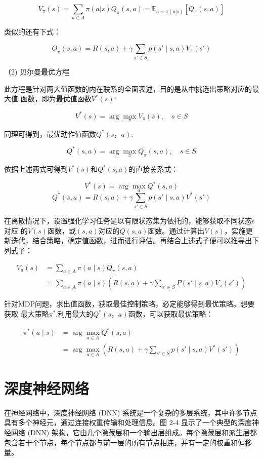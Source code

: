 \[
V_{\pi}(s) = \sum_{a \in A} \pi(a|s) Q_{\pi}(s,a) = \mathbb{E}_{a \sim \pi(a|s)} \left[ Q_{\pi}(s,a) \right]
\]

类似的还有下式：

\[
\underline{O}_{\pi}(s, a) = R(s, a) + \gamma \sum_{s' \in S} p(s' \mid s, a) V_{\pi}(s')
\]

（2) 贝尔曼最优方程

此方程是针对两大值函数的内在联系的全面表述，目的是从中挑选出策略对应的最大值
函数，即为最优值函数$V^*(s)$:

\[
V^*(s) = \arg\max_{\pi} V_{\pi}(s), \quad s \in S
\]

同理可得到，最优动作值函数$Q^*(s，a)$:

\[
Q^*(s, a) = \arg\max_{\pi} Q_{\pi}(s, a), \quad s \in S
\]

依据上述两式可得到$V^*(s)$和$Q^*(s,a)$的直接关系式：

\[
V^*(s) = \arg\max_{a} Q^*(s, a)
\]
\[
Q^*(s, a) = R(s, a) + \gamma \sum_{s' \in S} p(s' \mid s, a) V^*(s')
\]

在离散情况下，设置强化学习任务是以有限状态集为依托的，能够获取不同状态s对应
的$V(s)$函数，或$(s,a)$对应的$Q(s,a)$函数。通过计算出$V(s)$，实施更新迭代，结合策略，确定值函数，进而进行评估。再结合上述式子便可以推导出下列式子：

\begin{align*}
	V_{\pi}(s) &= \sum_{a \in A} \pi(a \mid s) Q_{\pi}(s, a) \\
	&= \sum_{a \in A} \pi(a \mid s) \left( R(s, a) + \gamma \sum_{s' \in S} P(s' \mid s, a) V_{\pi}(s') \right)
\end{align*}

针对MDP问题，求出值函数，获取最佳控制策略，必定能够得到最优策略。想要获取
最大策略$\pi^*$,利用最大的$Q^*(s，a)$函数，可以获取最优策略：

\begin{align*}
	\pi^*(a \mid s) &= \arg\max_{a \in A} Q^*(s, a) \\
	&= \arg\max_{a \in A} \left( R(s, a) + \gamma \sum_{s' \in S} p(s' \mid s, a) V^*(s') \right)
\end{align*}

\section{深度神经网络}

在神经网络中，深度神经网络 (DNN) 系统是一个复杂的多层系统，其中许多节点具有多个神经元，通过连接权重传输和处理信息。图 2-4 显示了一个典型的深度神经网络 (DNN) 架构，它由几个隐藏层和一个输出层组成。每个隐藏层和派生层都包含若干个节点，每个节点都与前一层的所有节点相连，并有一定的权重和偏移量。

